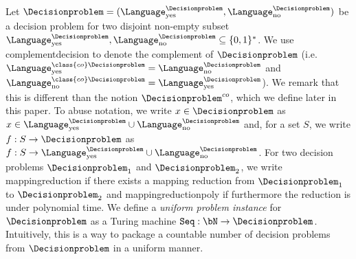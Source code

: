 Let $\Decisionproblem = (\Language_{\text{yes}}^{\Decisionproblem}, \Language_{\text{no}}^{\Decisionproblem})$ be a decision problem for two disjoint non-empty subset $\Language_{\text{yes}}^{\Decisionproblem}, \Language_{\text{no}}^{\Decisionproblem} \subseteq \{0,1\}^*$. We use \gls{complementdecision} to denote the complement of $\Decisionproblem$ (i.e. $\Language_{\text{yes}}^{\class{co}\Decisionproblem} = \Language_{\text{no}}^{\Decisionproblem}$ and $\Language_{\text{no}}^{\class{co}\Decisionproblem} = \Language_{\text{yes}}^{\Decisionproblem}$). We remark that this is different than the notion $\Decisionproblem^{co}$, which we define later in this paper. To abuse notation, we write $x \in \Decisionproblem$ as $x \in  \Language_{\text{yes}}^{\Decisionproblem} \cup \Language_{\text{no}}^{\Decisionproblem}$ and, for a set $S$, we write $f: S\rightarrow \Decisionproblem$ as $f: S \rightarrow \Language_{\text{yes}}^{\Decisionproblem} \cup \Language_{\text{no}}^{\Decisionproblem}$. For two decision problems $\Decisionproblem_1$ and $\Decisionproblem_2$, we write \gls{mappingreduction} if there exists a mapping reduction from $\Decisionproblem_1$ to $\Decisionproblem_2$ and \gls{mappingreductionpoly} if furthermore the reduction is under polynomial time. We define a \textit{uniform problem instance} for $\Decisionproblem$ as a Turing machine $\texttt{Seq}: \bN \rightarrow \Decisionproblem$. Intuitively, this is a way to package a countable number of decision problems from $\Decisionproblem$ in a uniform manner.

